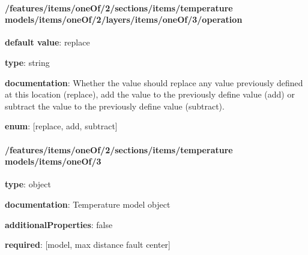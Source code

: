 \begin{itemized}
\end{itemized}\paragraph{/features/items/oneOf/2/sections/items/temperature models/items/oneOf/2/layers/items/oneOf/3/operation} \begin{itemized}
\item {\bf default value}: replace
\item {\bf type}: string
\item {\bf documentation}: Whether the value should replace any value previously defined at this location (replace), add the value to the previously define value (add) or subtract the value to the previously define value (subtract).
\item {\bf enum}: [replace, add, subtract]\end{itemized}\paragraph{/features/items/oneOf/2/sections/items/temperature models/items/oneOf/3} \begin{itemized}
\item {\bf type}: object
\item {\bf documentation}: Temperature model object
\item {\bf additionalProperties}: false
\item {\bf required}: [model, max distance fault center]\end{itemized}

